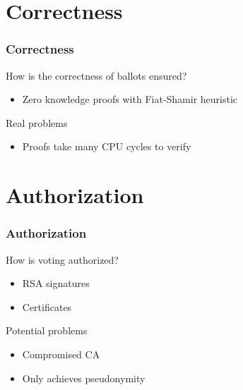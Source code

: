 \documentclass[aspectratio=1610, compress, bigger]{beamer}
\begin{document}
\section{Correctness}
\begin{frame}\frametitle{Correctness}

\begin{block}{How is the correctness of ballots ensured?}
\begin{itemize}
\item Zero knowledge proofs with Fiat-Shamir heuristic
\end{itemize}
\end{block}

\pause

\begin{alertblock}{Real problems}
\begin{itemize}
\item Proofs take many CPU cycles to verify
\end{itemize}
\end{alertblock}

\end{frame}

\section{Authorization}
\begin{frame}\frametitle{Authorization}

\begin{block}{How is voting authorized?}
\begin{itemize}
\item RSA signatures
\item Certificates
\end{itemize}
\end{block}

\pause

\begin{alertblock}{Potential problems}
\begin{itemize}
\item Compromised CA
\item Only achieves pseudonymity
\end{itemize}
\end{alertblock}

\end{frame}
\end{document}
